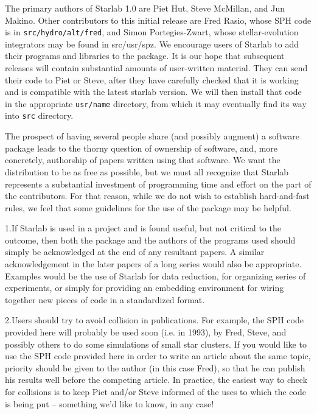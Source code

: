 The primary authors of Starlab 1.0 are Piet Hut, Steve McMillan, and
Jun Makino.  Other contributors to this initial release are Fred
Rasio, whose SPH code is in {\tt src/hydro/alt/fred}, and Simon
Portegies-Zwart, whose stellar-evolution integrators may be found in
src/usr/spz.  We encourage users of Starlab to add their programs and
libraries to the package.  It is our hope that subsequent releases
will contain substantial amounts of user-written material.  They can
send their code to Piet or Steve, after they have carefully checked
that it is working and is compatible with the latest starlab version.
We will then install that code in the appropriate {\tt usr/name}
directory, from which it may eventually find its way into {\tt src}
directory.

The prospect of having several people share (and possibly augment) a
software package leads to the thorny question of ownership of
software, and, more concretely, authorship of papers written using
that software.  We want the distribution to be as free as possible,
but we must all recognize that Starlab represents a substantial
investment of programming time and effort on the part of the
contributors.  For that reason, while we do not wish to establish
hard-and-fast rules, we feel that some guidelines for the use of the
package may be helpful.

\item{1.}{If Starlab is used in a project and is found useful, but not
critical to the outcome, then both the package and the authors of the
programs used should simply be acknowledged at the end of any
resultant papers.  A similar acknowledgement in the later papers of a
long series would also be appropriate.  Examples would be the use of
Starlab for data reduction, for organizing series of experiments, or
simply for providing an embedding environment for wiring together new
pieces of code in a standardized format.}

\item{2.}{Users should try to avoid collision in publications.  For
example, the SPH code provided here will probably be used soon (i.e.
in 1993), by Fred, Steve, and possibly others to do some simulations
of small star clusters.  If you would like to use the SPH code
provided here in order to write an article about the same topic,
priority should be given to the author (in this case Fred), so that he
can publish his results well before the competing article.  In
practice, the easiest way to check for collisions is to keep Piet and/or
Steve informed of the uses to which the code is being put -- something
we'd like to know, in any case!}

